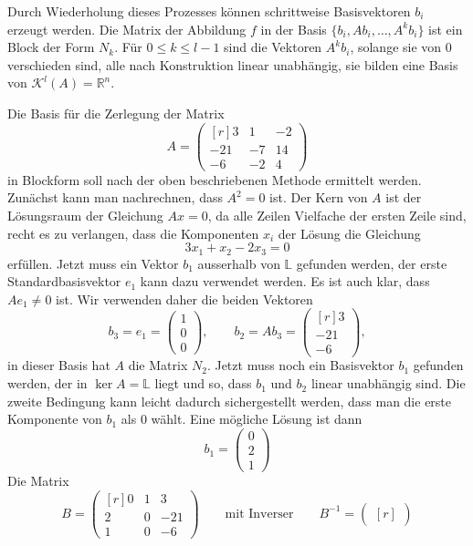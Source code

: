 Durch Wiederholung dieses Prozesses können schrittweise Basisvektoren
$b_i$ erzeugt werden.
Die Matrix der Abbildung $f$ in der Basis $\{b_i,Ab_i,\dots,A^kb_i\}$
ist ein Block der Form $N_k$.
Für $0\le k\le l-1$ sind die Vektoren $A^kb_i$,
solange sie von $0$ verschieden sind,
alle nach Konstruktion linear unabhängig, sie bilden eine Basis
von $\mathcal{K}^l(A)=\mathbb{R}^n$.

\begin{beispiel}
Die Basis für die Zerlegung der Matrix
\[
A
=
\begin{pmatrix*}[r]
  3& 1&-2\\
-21&-7&14\\
 -6&-2& 4
\end{pmatrix*}
\]
in Blockform soll nach der oben beschriebenen Methode ermittelt werden.
Zunächst kann man nachrechnen, dass $A^2=0$ ist.
Der Kern von $A$ ist der Lösungsraum der Gleichung $Ax=0$, da alle Zeilen
Vielfache der ersten Zeile sind, recht es zu verlangen, dass die
Komponenten $x_i$ der Lösung die Gleichung
\[
3x_1+x_2-2x_3=0
\]
erfüllen.
Jetzt muss ein Vektor $b_1$ ausserhalb von $\mathbb{L}$ gefunden werden,
der erste Standardbasisvektor $e_1$ kann dazu verwendet werden.
Es ist auch klar, dass $Ae_1\ne 0$ ist.
Wir verwenden daher die beiden Vektoren 
\[
b_3=e_1=\begin{pmatrix} 1\\0\\0 \end{pmatrix}
,\qquad
b_2=Ab_3=\begin{pmatrix*}[r] 3\\-21\\-6 \end{pmatrix*},
\]
in dieser Basis hat $A$ die Matrix $N_2$.
Jetzt muss noch ein Basisvektor $b_1$ gefunden werden,
der in $\ker A=\mathbb{L}$ liegt und so, dass $b_1$ und $b_2$ 
linear unabhängig sind.
Die zweite Bedingung kann leicht dadurch sichergestellt werden,
dass man die erste Komponente von $b_1$ als $0$ wählt.
Eine mögliche Lösung ist dann
\[
b_1=\begin{pmatrix}0\\2\\1\end{pmatrix}
\]
Die Matrix 
\[
B=\begin{pmatrix*}[r]
 0& 1&   3\\
 2& 0& -21\\
 1& 0&  -6
\end{pmatrix*}
\qquad\text{mit Inverser}
\qquad
B^{-1}=\begin{pmatrix*}[r]

\end{pmatrix*}\]
\end{beispiel}
